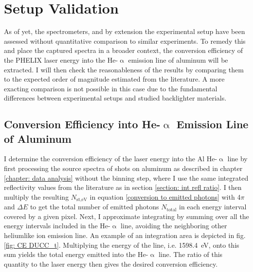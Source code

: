 \section{Setup Validation}
\label{section: setup validation}

As of yet, the spectrometers, and by extension the experimental setup have been assessed without quantitative comparison to similar experiments. To remedy this and place the captured spectra in a broader context, the conversion efficiency of the PHELIX laser energy into the He-$\upalpha$ emission line of aluminum will be extracted. I will then check the reasonableness of the results by comparing them to the expected order of magnitude estimated from the literature. A more exacting comparison is not possible in this case due to the fundamental differences between experimental setups and studied backlighter materials.

\subsection{Conversion Efficiency into He-$\upalpha$ Emission Line of Aluminum}

I determine the conversion efficiency of the laser energy into the Al He-$\upalpha$ line by first processing the source spectra of shots on aluminum as described in chapter \ref{chapter: data analysis} without the binning step, where I use the same integrated reflectivity values from the literature as in section \ref{section: int refl ratio}. I then multiply the resulting $N_{\text{st,eV}}$ in equation \ref{conversion to emitted photons} with 4$\pi$ and $\Delta E$ to get the total number of emitted photons $N_{\text{total}}$ in each energy interval covered by a given pixel. Next, I approximate integrating by summing over all the energy intervals included in the He-$\upalpha$ line, avoiding the neighboring other heliumlike ion emission line. An example of an integration area is depicted in fig. \ref{fig: CE DUCC_t}. Multiplying the energy of the line, i.e. \SI{1598.4}{\electronvolt}, onto this sum yields the total energy emitted into the He-$\upalpha$ line. The ratio of this quantity to the laser energy then gives the desired conversion efficiency.

